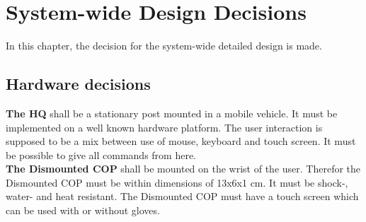 \chapter{System-wide Design Decisions}

In this chapter, the decision for the system-wide detailed design is made.
\section{Hardware decisions}
\textbf{The HQ} shall be a stationary post mounted in a mobile vehicle. It must be implemented on a well known hardware platform. The user interaction is supposed to be a mix between use of mouse, keyboard and touch screen. It must be possible to give all commands from here.\\

\textbf{The Dismounted COP} shall be mounted on the wrist of the user. Therefor the Dismounted COP must be within dimensions of 13x6x1 cm. It must be shock-, water- and heat resistant. The Dismounted COP must have a touch screen which can be used with or without gloves.


